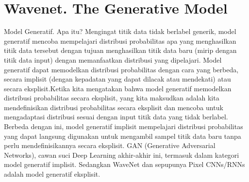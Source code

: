 \section{Wavenet. The Generative Model}
Model Generatif. Apa itu? Mengingat titik data tidak berlabel generik, model generatif mencoba mempelajari distribusi probabilitas apa yang menghasilkan titik data tersebut dengan tujuan menghasilkan titik data baru (mirip dengan titik data input) dengan memanfaatkan distribusi yang dipelajari. Model generatif dapat memodelkan distribusi probabilitas dengan cara yang berbeda, secara implisit (dengan kepadatan yang dapat dilacak atau mendekati) atau secara eksplisit.Ketika kita mengatakan bahwa model generatif memodelkan distribusi probabilitas secara eksplisit, yang kita maksudkan adalah kita mendefinisikan distribusi probabilitas secara eksplisit dan mencoba untuk mengadaptasi distribusi sesuai dengan input titik data yang tidak berlabel. Berbeda dengan ini, model generatif implisit mempelajari distribusi probabilitas yang dapat langsung digunakan untuk mengambil sampel titik data baru tanpa perlu mendefinisikannya secara eksplisit. GAN (Generative Adversarial Networks), cawan suci Deep Learning akhir-akhir ini, termasuk dalam kategori model generatif implisit. Sedangkan WaveNet dan sepupunya Pixel CNNs/RNNs adalah model generatif eksplisit.

